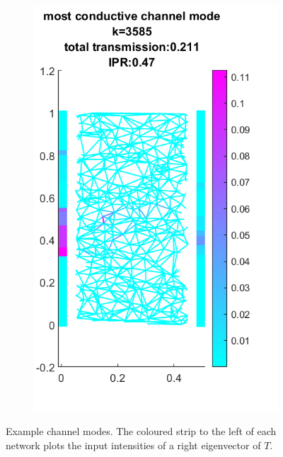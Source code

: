 \begin{figure}[htp]
\begin{subfigure}[b]{0.4\textwidth}
        \includegraphics[width=\textwidth]{ch3/fig3/channel_mode_N500D05d.png}
    \end{subfigure}
    \caption{Example channel modes. The coloured strip to the left of each network plots the input intensities of a right eigenvector of $T$.}\label{fig:channel_mode_examples}
\end{figure}


